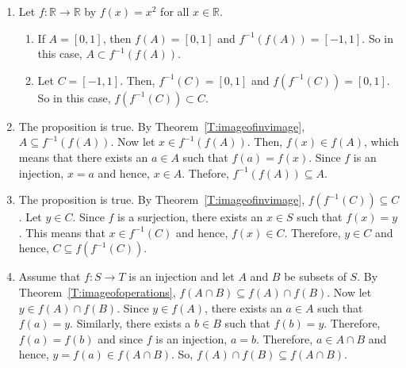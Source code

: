 \begin{enumerate}
\begin{multicols}{4}
$B = \left\{ 2, 3 \right\}$
\end{multicols}
$f: S \to T$ by $f \left( 1 \right) = a$, $f \left( 2 \right) = a$, $f \left( 3 \right) = b$.

Then,

$f \left( A \right) \cap f \left( B \right) = \left\{ a \right\}$ and $f \left( A \cap B \right) = \emptyset$.

\item Let $f: \mathbb{R} \to \mathbb{R}$ by $f \left( x \right) = x^2$ for all 
$x \in \mathbb{R}$.  
\begin{enumerate}
\item If $A = \left[ 0, 1 \right]$, then 
$f \left( A \right) = \left[ 0, 1 \right]$ and 
$f^{-1} \left( f \left( A \right) \right) = \left[ -1, 1 \right]$.  So in this case, 
$A \subset f^{-1} \left( f \left( A \right) \right)$.

\item Let $C = \left[ - 1, 1 \right]$.  Then, $f^{-1} \left( C \right) = \left[ 0, 1 \right]$ and 
$f \left( f^{-1} \left( C \right) \right) = \left[ 0, 1 \right]$.  So in this case, 
$f \left( f^{-1} \left( C \right) \right) \subset C$.
\end{enumerate}

\item The proposition is true.  By Theorem~\ref{T:imageofinvimage}, 
$A \subseteq f^{-1} \left( f \left( A \right) \right)$.  Now let 
$x \in f^{-1} \left( f \left( A \right) \right)$.  Then, 
$f \left( x \right) \in f \left( A \right)$, which means that there exists an $a \in A$ such that 
$f \left( a \right) = f \left( x \right)$.  Since $f$ is an injection, $x = a$ and hence, 
$x \in A$.  Thefore, $f^{-1} \left( f \left( A \right) \right) \subseteq A$.

\item The proposition is true.  By Theorem~\ref{T:imageofinvimage},
$f \left( f^{-1} \left( C \right) \right) \subseteq C$.  Let $y \in C$.  Since $f$ is a surjection, there exists an $x \in S$ such that $f \left( x \right) = y$.  This means that 
$x \in f^{-1} \left( C \right)$ and hence, $f \left( x \right) \in C$.  Therefore, 
$y \in C$ and hence, $C \subseteq f \left( f^{-1} \left( C \right) \right)$.

\item Assume that $f : S \to T$ is an injection and let $A$ and $B$ be subsets of $S$.  By 
Theorem~\ref{T:imageofoperations}, 
$f \left( A \cap B \right) \subseteq f \left( A \right) \cap f \left( B \right)$.  Now let 
$y \in f \left( A \right) \cap f \left( B \right)$.  Since $y \in f \left( A \right)$, there exists an $a \in A$ such that $f \left( a \right) = y$.  Similarly, there exists a $b \in B$ such that $f \left( b \right) = y$.  Therefore, $f \left( a \right) = f \left( b \right)$ and since 
$f$ is an injection, $a = b$.  Therefore, $a \in A \cap B$ and hence, 
$y = f \left( a \right) \in f \left( A \cap B \right)$.  So, 
$f \left( A \right) \cap f \left( B \right) \subseteq f \left( A \cap B \right)$.


\end{enumerate}

